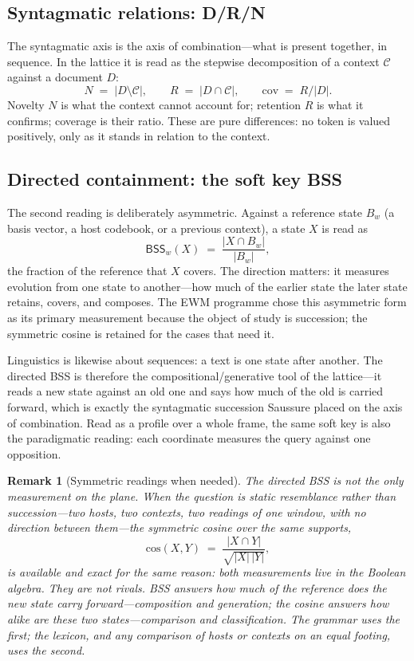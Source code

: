 \documentclass[11pt,a4paper]{article}
\newtheorem{remark}[principle]{Remark}
\theoremstyle{remark}
\newcommand{\BSS}{\ensuremath{\mathsf{BSS}}}             %
\newcommand{\Ctx}{\ensuremath{\mathcal{C}}}              %
\newcommand{\Cov}{\ensuremath{\mathrm{cov}}}             %
\begin{document}
\subsection{Syntagmatic relations: D/R/N}
The syntagmatic axis is the axis of combination---what is present together, in
sequence. In the lattice it is read as the stepwise decomposition of a context
$\Ctx$ against a document $D$:
\[
  N \;=\; |D \setminus \Ctx|, \qquad
  R \;=\; |D \cap \Ctx|, \qquad
  \Cov \;=\; R / |D| .
\]
Novelty $N$ is what the context cannot account for; retention $R$ is what it
confirms; coverage is their ratio. These are pure differences: no token is
valued positively, only as it stands in relation to the context.

\subsection{Directed containment: the soft key BSS}
The second reading is deliberately asymmetric. Against a reference state $B_w$
(a basis vector, a host codebook, or a previous context), a state $X$ is read
as
\[
  \BSS_w(X) \;=\; \frac{|X \cap B_w|}{|B_w|},
\]
the fraction of the reference that $X$ covers. The direction matters: it
measures evolution from one state to another---how much of the earlier state
the later state retains, covers, and composes. The EWM programme chose this
asymmetric form as its primary measurement because the object of study is
succession; the symmetric cosine is retained for the cases that need it.

Linguistics is likewise about sequences: a text is one state after another.
The directed BSS is therefore the compositional/generative tool of the
lattice---it reads a new state against an old one and says how much of the old
is carried forward, which is exactly the syntagmatic succession Saussure
placed on the axis of combination. Read as a profile over a whole frame, the
same soft key is also the paradigmatic reading: each coordinate measures the
query against one opposition.

\begin{remark}[Symmetric readings when needed]
The directed BSS is not the only measurement on the plane. When the question
is static resemblance rather than succession---two hosts, two contexts, two
readings of one window, with no direction between them---the symmetric
cosine over the same supports,
\[
  \mathrm{cos}(X, Y) \;=\; \frac{|X \cap Y|}{\sqrt{|X|\,|Y|}},
\]
is available and exact for the same reason: both measurements live in the
Boolean algebra. They are not rivals. BSS answers \emph{how much of the
reference does the new state carry forward}---composition and generation; the
cosine answers \emph{how alike are these two states}---comparison and
classification. The grammar uses the first; the lexicon, and any comparison of
hosts or contexts on an equal footing, uses the second.
\end{remark}
\end{document}
